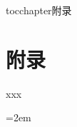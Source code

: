 
\newenvironment{theappendix}{\wuhao\song}

\addcontentsline{toc}{chapter}{附录}%
\chapter*{\centering\xiaosan\hei\bfseries 附\quad 录}

\begin{theappendix}

\setlength{\parindent}{0em}
\begin{publist}
	\item	xxx
\end{publist}

\vfill
{}\hangindent=2em\noindent
\setlength{\parindent}{2em}

\end{theappendix}

